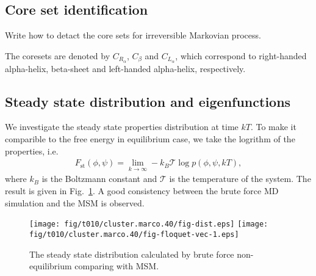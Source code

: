 \documentclass[aps, pre, preprint,unsortedaddress,a4paper,onecolumn]{revtex4}
\newcommand{\redc}[1]{{\color{red} #1}}
\begin{document}


\subsection{Core set identification}

\redc{Write how to detact the core sets for irreversible Markovian process}.

The coresets are denoted by $C_{R_\alpha}$, $C_\beta$ and $C_{L_\alpha}$, which correspond to
right-handed alpha-helix, beta-sheet and left-handed alpha-helix, respectively.

\subsection{Steady state distribution and eigenfunctions}
We investigate the steady state properties distribution at time $kT$. To make it comparible to
the free energy in equilibrium case, we take the logrithm of the properties, i.e.
\begin{align}
  \label{eq:num-tmp1}
  F_{\textrm{st}}(\phi,\psi) = \lim_{k\rightarrow\infty} -k_B\mathcal T \log p(\phi,\psi,kT),
\end{align}
where $k_B$ is the Boltzmann constant and $\mathcal T$ is the temperature of the system.
The result is given in Fig.~\ref{fig:num-1}. A good consistency between the brute force
MD simulation and the MSM is observed.

\begin{figure}
  \centering  
  \texttt{[image: fig/t010/cluster.marco.40/fig-dist.eps]}
  \texttt{[image: fig/t010/cluster.marco.40/fig-floquet-vec-1.eps]}
  \caption{The steady state distribution calculated by brute force non-equilibrium comparing with MSM.}
  \label{fig:num-1}
\end{figure}
\end{document}
